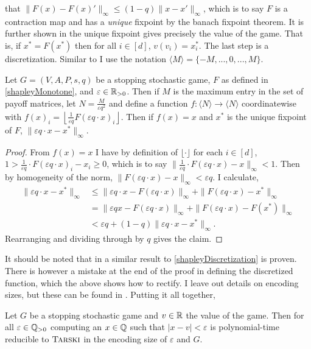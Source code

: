 that $\|F(x) - F(x)'\|_\infty \leq (1 - q) \|x - x'\|_\infty$,
which is to say $F$ is a contraction map and has a \emph{unique} fixpoint by the banach fixpoint theorem. 
It is further shown in \citep{shapley} the unique fixpoint gives precisely the value of the game. That is, 
if $x^* = F(x^*)$ then
for all $i \in [d]$, $v(v_i) = x^*_i$. The last step is a discretization. Similar to \citep{lowerBound} I
use the notation $\langle M \rangle = \{-M, ..., 0, ..., M\}$. 
\newcommand{\angm}{\langle M \rangle}
\begin{lemma} \label{shapleyDiscretization}
  Let $G = (V, A, P, s, q)$ be a stopping stochastic game, $F$ as defined in \cref{shapleyMonotone}, 
  and $\varepsilon \in \mathbb{R}_{> 0}$. Then if $M$ is the maximum entry in the set of payoff matrices, let 
  $N = \frac{M}{\varepsilon q^2}$ and define a function $f : \langle N \rangle \to \langle N \rangle$ coordinatewise with
  $f(x)_i = \left\lfloor \frac{1}{\varepsilon q} F(\varepsilon q \cdot x)_i \right\rfloor$. Then if $f(x) = x$
  and $x^*$ is the unique fixpoint of $F$, $\|\varepsilon q \cdot x - x^*\|_\infty$.
\end{lemma}
\begin{proof}
  From $f(x) = x$ I have by definition of $\lfloor \cdot \rfloor$ for each $i \in [d]$,
  $1 > \frac{1}{\varepsilon q} \cdot F(\varepsilon q \cdot x)_i - x_i \geq 0$, which is to say
  $\|\frac{1}{\varepsilon q} \cdot F(\varepsilon q \cdot x) - x\|_\infty < 1$. Then by homogeneity of the norm,
  $\|F(\varepsilon q \cdot x) - x\|_\infty < \varepsilon q$. I calculate,
  \begin{align*}
    \|\varepsilon q \cdot x - x^* \|_\infty &\leq \|\varepsilon q \cdot x - F(\varepsilon q \cdot x) \|_\infty
                                           + \| F(\varepsilon q \cdot x) - x^* \|_\infty \\
                                      &=  \|\varepsilon q x - F(\varepsilon q \cdot x) \|_\infty
                                        +  \| F(\varepsilon q \cdot x) - F(x^*) \|_\infty \\
                                      &< \varepsilon q + (1 - q)\| \varepsilon q \cdot x - x^* \|_\infty.
  \end{align*}
  Rearranging and dividing through by $q$ gives the claim.
\end{proof}
It should be noted that in \citep[Proposition 6.2.]{lowerBound} a similar result to \cref{shapleyDiscretization} 
is proven. There is however a mistake at the end of the proof in defining the discretized function, which the above
shows how to rectify.
I leave out details on encoding sizes, but these can be found in \citep{lowerBound}.
Putting it all together,
\begin{theorem}
  Let $G$ be a stopping stochastic game and $v \in \mathbb{R}$ the value of the game. Then for all $\varepsilon \in \mathbb{Q}_{> 0}$
  computing 
  an $x \in \mathbb{Q}$ such that $|x - v| < \varepsilon$ is polynomial-time reducible to $\textsc{Tarski}$ in the encoding size
  of $\varepsilon$ and $G$.
\end{theorem}
